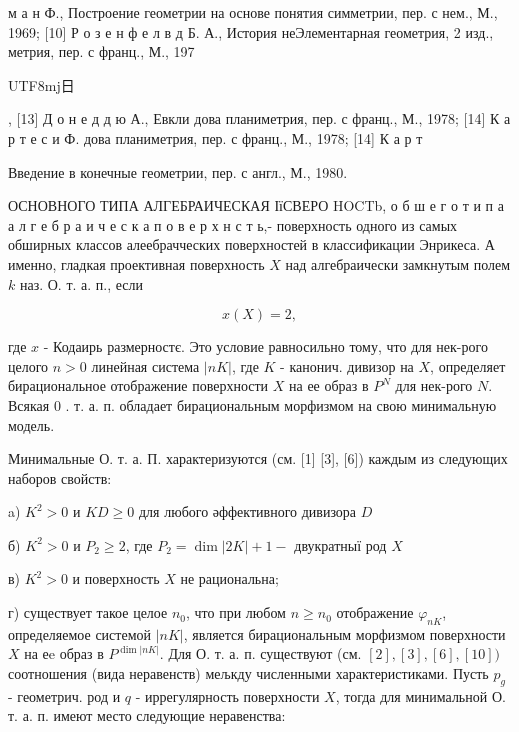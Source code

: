\documentclass[10pt]{article}
\begin{document}
м а н Ф., Построение геометрии на основе понятия симметрии, пер. с нем., М., 1969; [10] Р о з е н ф е л в д Б. А., История неЭлементарная геометрия, 2 изд., метрия, пер. с франц., М., 197\begin{CJK}{UTF8}{mj}日\end{CJK}, [13] Д о н е д д ю А., Евкли дова планиметрия, пер. с франц., М., 1978; [14] К а р т е с и Ф. дова планиметрия, пер. с франц., М., 1978; [14] К а р т

Введение в конечные геометрии, пер. с англ., М., 1980.



ОСНОВНОГО ТИПА АЛГЕБРАИЧЕСКАЯ ІїСВЕРО HOCTb, о б ш е г о т и п а а л г е б р а и ч е с к а п о в е р х н с т ь,- поверхность одного из самых обширных классов алеебрачческих поверхностей в классификации Энрикеса. А именно, гладкая проективная поверхность $X$ над алгебраически замкнутым полем $k$ наз. О. т. а. п., если



\[

x(X)=2,

\]



где $x$ - Кодаирь размерностє. Это условие равносильно тому, что для нек-рого целого $n>0$ линейная система $|n K|$, где $K$ - канонич. дивизор на $X$, определяет бирациональное отображение поверхности $X$ на ее образ в $P^{N}$ для нек-рого $N$. Всякая 0 . т. а. п. обладает бирациональным морфизмом на свою минимальную модель.



Минимальные О. т. а. П. характеризуются (см. [1] [3], [6]) каждым из следующих наборов свойств:



a) $K^{2}>0$ и $K D \geqslant 0$ для любого әффективного дивизора $D$



б) $K^{2}>0$ и $P_{2} \geqslant 2$, где $P_{2}=\operatorname{dim}|2 K|+1-$ двукратныї род $X$



в) $K^{2}>0$ и поверхность $X$ не рациональна;



г) существует такое целое $n_{0}$, что при любом $n \geqslant n_{0}$ отображение $\varphi_{n K}$, определяемое системой $|n K|$, является бирациональным морфизмом поверхности $X$ на еe образ в $P^{\operatorname{dim}|n K|}$. Для О. т. а. п. существуют (см. $[2],[3],[6],[10])$ соотношения (вида неравенств) мељкду численными характеристиками. Пусть $p_{g}$ - геометрич. род и $q$ - иррегулярность поверхности $X$, тогда для минимальной О. т. а. п. имеют место следующие неравенства:
\end{document}

